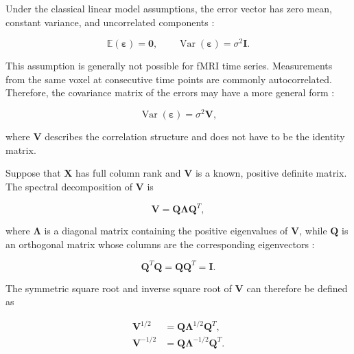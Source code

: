\documentclass[english]{pwr_wmat_praca_dyplomowa}
\theoremstyle{definition}
\theoremstyle{remark}
\begin{document}
Under the classical linear model assumptions, the error vector has zero mean, constant variance, and uncorrelated components \cite[Section 2.2]{agresti}:

\begin{equation}
    \mathbb{E}(\boldsymbol{\varepsilon}) = \mathbf{0},
    \qquad
    \operatorname{Var}(\boldsymbol{\varepsilon}) = \sigma^2\mathbf{I}.
\end{equation}

This assumption is generally not possible for fMRI time series. Measurements from the same voxel at consecutive time points are commonly autocorrelated. Therefore, the covariance matrix of the errors may have a more general form \cite[Section 2.7.2]{agresti}:

\begin{equation}
    \operatorname{Var}(\boldsymbol{\varepsilon}) = \sigma^2\mathbf{V},
    \label{eq:general-error-covariance}
\end{equation}

where $\mathbf{V}$ describes the correlation structure and does not have to be the identity matrix.

Suppose that $\mathbf{X}$ has full column rank and $\mathbf{V}$ is a known, positive definite matrix. The spectral decomposition of $\mathbf{V}$ is

\begin{equation}
    \mathbf{V} = \mathbf{Q}\boldsymbol{\Lambda}\mathbf{Q}^T,
\end{equation}

where $\boldsymbol{\Lambda}$ is a diagonal matrix containing the positive eigenvalues of $\mathbf{V}$, while $\mathbf{Q}$ is an orthogonal matrix whose columns are the corresponding eigenvectors \cite[Section 2.7.2]{agresti}:

\begin{equation}
    \mathbf{Q}^T\mathbf{Q} = \mathbf{Q}\mathbf{Q}^T = \mathbf{I}.
\end{equation}

\newpage

The symmetric square root and inverse square root of $\mathbf{V}$ can therefore be defined as

\begin{align}
    \mathbf{V}^{1/2} &= \mathbf{Q}\boldsymbol{\Lambda}^{1/2}\mathbf{Q}^T, \\
    \mathbf{V}^{-1/2} &= \mathbf{Q}\boldsymbol{\Lambda}^{-1/2}\mathbf{Q}^T.
\end{align}
\end{document}
